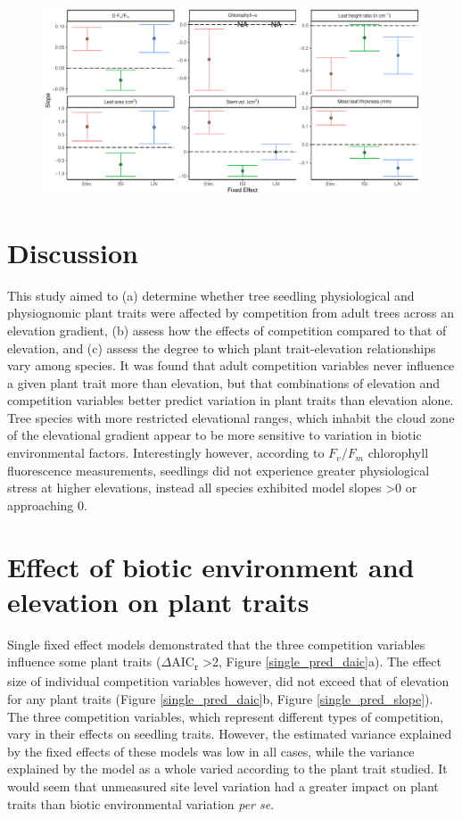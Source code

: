 \documentclass[a4paper, 11pt]{article}
\begin{document}
\begin{figure}[H]
\includegraphics[width=\textwidth]{multi_pred_slope}
\centering
\caption{}
\label{multi_pred_slope}
\end{figure}



\section*{Discussion}

This study aimed to (a) determine whether tree seedling physiological and physiognomic plant traits were affected by competition from adult trees across an elevation gradient, (b) assess how the effects of competition compared to that of elevation, and (c) assess the degree to which plant trait-elevation relationships vary among species. It was found that adult competition variables never influence a given plant trait more than elevation, but that combinations of elevation and competition variables better predict variation in plant traits than elevation alone. Tree species with more restricted elevational ranges, which inhabit the cloud zone of the elevational gradient appear to be more sensitive to variation in biotic environmental factors. Interestingly however, according to $F_v/F_m$ chlorophyll fluorescence measurements, seedlings did not experience greater physiological stress at higher elevations, instead all species exhibited model slopes \textgreater{}0 or approaching 0.

\section{Effect of biotic environment and elevation on plant traits}

Single fixed effect models demonstrated that the three competition variables influence some plant traits ($\Delta$AIC\textsubscript{r} >2, Figure \ref{single_pred_daic}a). The effect size of individual competition variables however, did not exceed that of elevation for any plant traits (Figure \ref{single_pred_daic}b, Figure \ref{single_pred_slope}). The three competition variables, which represent different types of competition, vary in their effects on seedling traits. However, the estimated variance explained by the fixed effects of these models was low in all cases, while the variance explained by the model as a whole varied according to the plant trait studied. It would seem that unmeasured site level variation had a greater impact on plant traits than biotic environmental variation \textit{per se}.
\end{document}
